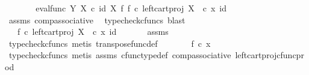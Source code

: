 \begin{isabellebody}
\ \ \isamarkupfalse%
\ \isamarkupfalse%
\ {\isachardoublequoteopen}{\isachardot}{\kern0pt}{\isachardot}{\kern0pt}{\isachardot}{\kern0pt}\ {\isacharequal}{\kern0pt}\ {\isacharparenleft}{\kern0pt}eval{\isacharunderscore}{\kern0pt}func\ Y\ X\ {\isasymcirc}\isactrlsub c\ {\isacharparenleft}{\kern0pt}id\ X\ {\isasymtimes}\isactrlsub f\ {\isacharparenleft}{\kern0pt}f\ {\isasymcirc}\isactrlsub c\ {\isacharparenleft}{\kern0pt}left{\isacharunderscore}{\kern0pt}cart{\isacharunderscore}{\kern0pt}proj\ X\ {\isasymone}{\isacharparenright}{\kern0pt}{\isacharparenright}{\kern0pt}\isactrlsup {\isasymsharp}{\isacharparenright}{\kern0pt}{\isacharparenright}{\kern0pt}\ {\isasymcirc}\isactrlsub c\ {\isasymlangle}x{\isacharcomma}{\kern0pt}\ id\ {\isasymone}{\isasymrangle}{\isachardoublequoteclose}\isanewline
\ \ \ \ \isamarkupfalse%
\ assms\ comp{\isacharunderscore}{\kern0pt}associative{}\ \isamarkupfalse%
\ {\isacharparenleft}{\kern0pt}typecheck{\isacharunderscore}{\kern0pt}cfuncs{\isacharcomma}{\kern0pt}\ blast{\isacharparenright}{\kern0pt}\isanewline
\ \ \isamarkupfalse%
\ \isamarkupfalse%
\ {\isachardoublequoteopen}{\isachardot}{\kern0pt}{\isachardot}{\kern0pt}{\isachardot}{\kern0pt}\ {\isacharequal}{\kern0pt}\ {\isacharparenleft}{\kern0pt}f\ {\isasymcirc}\isactrlsub c\ {\isacharparenleft}{\kern0pt}left{\isacharunderscore}{\kern0pt}cart{\isacharunderscore}{\kern0pt}proj\ X\ {\isasymone}{\isacharparenright}{\kern0pt}{\isacharparenright}{\kern0pt}\ {\isasymcirc}\isactrlsub c\ {\isasymlangle}x{\isacharcomma}{\kern0pt}\ id\ {\isasymone}{\isasymrangle}{\isachardoublequoteclose}\isanewline
\ \ \ \ \isamarkupfalse%
\ assms\ \isamarkupfalse%
\ {\isacharparenleft}{\kern0pt}typecheck{\isacharunderscore}{\kern0pt}cfuncs{\isacharcomma}{\kern0pt}\ metis\ transpose{\isacharunderscore}{\kern0pt}func{\isacharunderscore}{\kern0pt}def{\isacharparenright}{\kern0pt}\isanewline
\ \ \isamarkupfalse%
\ \isamarkupfalse%
\ {\isachardoublequoteopen}{\isachardot}{\kern0pt}{\isachardot}{\kern0pt}{\isachardot}{\kern0pt}\ {\isacharequal}{\kern0pt}\ f\ {\isasymcirc}\isactrlsub c\ x{\isachardoublequoteclose}\isanewline
\ \ \ \ \isamarkupfalse%
\ {\isacharparenleft}{\kern0pt}typecheck{\isacharunderscore}{\kern0pt}cfuncs{\isacharcomma}{\kern0pt}\ metis\ assms\ cfunc{\isacharunderscore}{\kern0pt}type{\isacharunderscore}{\kern0pt}def\ comp{\isacharunderscore}{\kern0pt}associative\ left{\isacharunderscore}{\kern0pt}cart{\isacharunderscore}{\kern0pt}proj{\isacharunderscore}{\kern0pt}cfunc{\isacharunderscore}{\kern0pt}prod{\isacharparenright}{\kern0pt}\isanewline

\end{isabellebody}
